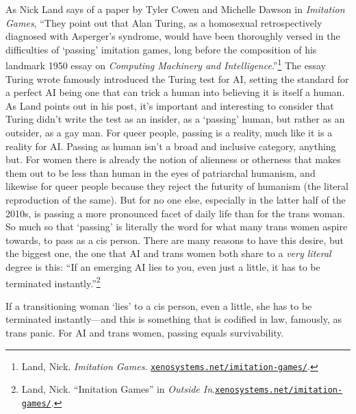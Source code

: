 \documentclass[10pt, statementpaper, twoside, openright]{memoir}
\begin{document}
As Nick Land says of a paper by Tyler Cowen and Michelle Dawson in \textit{Imitation Games}, ``They point out that Alan Turing, as a homosexual retrospectively diagnosed with Asperger's syndrome, would have been thoroughly versed in the difficulties of `passing' imitation games, long before the composition of his landmark 1950 essay on \textit{Computing Machinery and Intelligence}.''\footnote{Land, Nick. \textit{Imitation Games}. \href{http://www.xenosystems.net/imitation-games/}{\nolinkurl{xenosystems.net/imitation-games/}}.} The essay Turing wrote famously introduced the Turing test for AI, setting the standard for a perfect AI being one that can trick a human into believing it is itself a human. As Land points out in his post, it's important and interesting to consider that Turing didn't write the test as an insider, as a `passing' human, but rather as an outsider, as a gay man. For queer people, passing is a reality, much like it is a reality for AI. Passing as human isn't a broad and inclusive category, anything but. For women there is already the notion of alienness or otherness that makes them out to be less than human in the eyes of patriarchal humanism, and likewise for queer people because they reject the futurity of humanism (the literal reproduction of the same). But for no one else, especially in the latter half of the 2010s, is passing a more pronounced facet of daily life than for the trans woman. So much so that `passing' is literally the word for what many trans women aspire towards, to pass as a cis person. There are many reasons to have this desire, but the biggest one, the one that AI and trans women both share to a \textit{very literal} degree is this: ``If an emerging AI lies to you, even just a little, it has to be terminated instantly.''\footnote{Land, Nick. ``Imitation Games'' in \textit{Outside In}.\newline \href{http://www.xenosystems.net/imitation-games/}{\nolinkurl{xenosystems.net/imitation-games/}}.}

If a transitioning woman `lies' to a cis person, even a little, she has to be terminated instantly---and this is something that is codified in law, famously, as trans panic. For AI and trans women, passing equals survivability.
\end{document}
